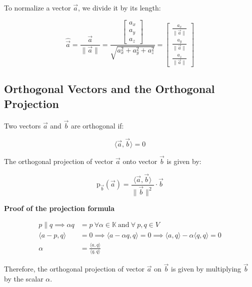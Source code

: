 To normalize a vector \(\vec{a}\), we divide it by its length:

\[
	\hat{\vec{a}} = \frac{\vec{a}}{\|\vec{a}\|} = \frac{\begin{bmatrix} a_x \\ a_y \\ a_z \end{bmatrix}}{\sqrt{a_x^2 + a_y^2 + a_z^2}} = \begin{bmatrix} \frac{a_x}{\|\vec{a}\|} \\ \frac{a_y}{\|\vec{a}\|} \\ \frac{a_z}{\|\vec{a}\|} \end{bmatrix}
\]

\subsection{Orthogonal Vectors and the Orthogonal Projection}

Two vectors \(\vec{a}\) and \(\vec{b}\) are orthogonal if:

\[
	\langle\vec{a}, \vec{b}\rangle = 0
\]

The orthogonal projection of vector \(\vec{a}\) onto vector \(\vec{b}\) is given by:

\[
	\text{p}_{\vec{b}}(\vec{a}) = \frac{\langle\vec{a}, \vec{b}\rangle}{\|\vec{b}\|^2} \cdot \vec{b}
\]

\textbf{Proof of the projection formula}

\begin{align*}
	p \| q \implies \alpha q &= p\ \forall \alpha \in \mathbb{K}\ \text{and}\ \forall\ p, q \in V\\
	\langle a - p, q\rangle &= 0 \implies \langle a - \alpha q, q\rangle = 0 \implies \langle a, q\rangle - \alpha \langle q, q\rangle = 0\\
	\alpha &= \frac{\langle a, q\rangle}{\langle q, q\rangle}
\end{align*}

Therefore, the orthogonal projection of vector \(\vec{a}\) on \(\vec{b}\) is given by
multiplying \(\vec{b}\) by the scalar \(\alpha\).

\QED

